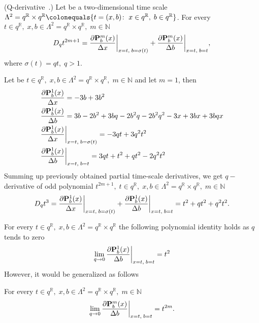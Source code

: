\begin{cor}
    \label{q_derivative_case}
    (Q-derivative~\cite{jackson_1909}.)
    Let be a two-dimensional time scale
    $\Lambda^2 = q^{\mathbb{R}} \times q^{\mathbb{R}} \colonequals \{t=(x,b) \colon \; x\in q^{\mathbb{R}}, \; b \in q^{\mathbb{R}} \}$.
    For every $t\in q^{\mathbb{R}}, \; x,b\in \Lambda^2 = q^{\mathbb{R}} \times q^{\mathbb{R}}, \; m\in\mathbb{N}$
    \[
        D_{q} t^{2m+1}
        = \frac{\partial {\mathbf{P}}\sp{m} \sb{b}(x)}{\Delta x} \bigg |_{x = t, \; b = \sigma(t)}
        + \frac{\partial {\mathbf{P}}\sp{m} \sb{b}(x)}{\Delta b} \bigg |_{x = t, \; b = t},
    \]
    where $\sigma(t) = qt, \; q > 1$.
\end{cor}
\begin{examp}
    \label{time_scale_qn_example_1}
    Let be $t\in q^{\mathbb{R}}, \; x,b\in \Lambda^2 = q^{\mathbb{R}} \times q^{\mathbb{R}}, \; m\in\mathbb{N}$
    and let $m=1$, then
    \begin{align*}
        &\frac{\partial {\mathbf{P}}\sp{1} \sb{b}(x)}{\Delta x} = -3 b + 3 b^2 \\
        &\frac{\partial {\mathbf{P}}\sp{1} \sb{b}(x)}{\Delta b} = 3 b - 2 b^2 + 3 b q - 2 b^2 q - 2 b^2 q^2 - 3 x + 3 b x + 3 b q x \\
        &\frac{\partial {\mathbf{P}}\sp{1} \sb{b}(x)}{\Delta x} \bigg |_{x = t, \; b = \sigma(t)} = -3 q t + 3 q^2 t^2 \\
        &\frac{\partial {\mathbf{P}}\sp{1} \sb{b}(x)}{\Delta b} \bigg |_{x = t, \; b = t} = 3 q t + t^2 + q t^2 - 2 q^2 t^2
    \end{align*}
    Summing up previously obtained partial time-scale derivatives, we get $q-$derivative of odd polynomial
    $t^{2m+1}, \; t\in q^{\mathbb{R}}, \; x,b\in \Lambda^2 = q^{\mathbb{R}} \times q^{\mathbb{R}}, \; m\in\mathbb{N}$
    \[
        D_{q} t^{3}
        = \frac{\partial {\mathbf{P}}\sp{1} \sb{b}(x)}{\Delta x} \bigg |_{x = t, \; b = \sigma(t)}
        + \frac{\partial {\mathbf{P}}\sp{1} \sb{b}(x)}{\Delta b} \bigg |_{x = t, \; b = t}
        = t^2 + q t^2 + q^2 t^2.
    \]
\end{examp}
For every $t\in q^{\mathbb{R}}, \; x,b\in \Lambda^2 = q^{\mathbb{R}} \times q^{\mathbb{R}}$
the following polynomial identity holds as $q$ tends to zero
\[
    \lim \limits_{q \to 0} \frac{\partial {\mathbf{P}}\sp{1} \sb{b}(x)}{\Delta b} \bigg |_{x = t, \; b = t} = t^2
\]
However, it would be generalized as follows
\begin{cor}
    \label{time_scale_qn_corollary_1}
    For every $t\in q^{\mathbb{R}}, \; x,b\in \Lambda^2 = q^{\mathbb{R}} \times q^{\mathbb{R}}, \; m\in\mathbb{N}$
    \[
        \lim \limits_{q \to 0} \frac{\partial {\mathbf{P}}\sp{m} \sb{b}(x)}{\Delta b} \bigg |_{x = t, \; b = t} = t^{2m}.
    \]
\end{cor}

